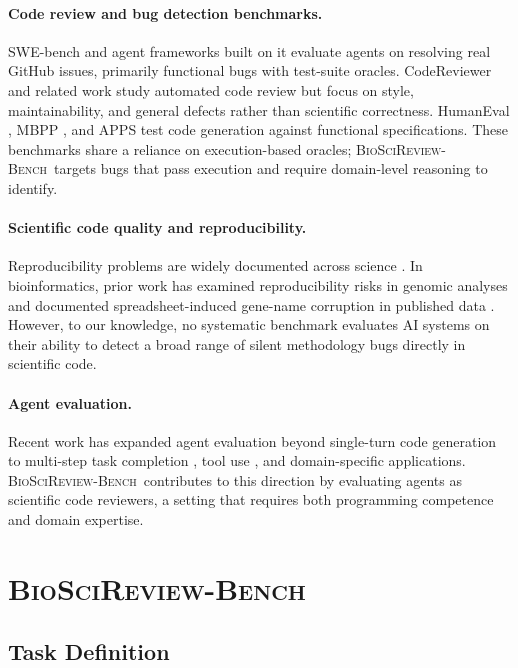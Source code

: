 \documentclass[11pt]{article}
\newcommand{\bench}{\textsc{BioSciReview-Bench}}
\begin{document}
\paragraph{Code review and bug detection benchmarks.}
SWE-bench \citep{jimenez2024swebench} and agent frameworks built on it \citep{yang2024sweagent} evaluate agents on resolving real GitHub issues, primarily functional bugs with test-suite oracles. CodeReviewer \citep{li2022codereviewer} and related work \citep{tufano2024code} study automated code review but focus on style, maintainability, and general defects rather than scientific correctness. HumanEval \citep{chen2021humaneval}, MBPP \citep{austin2021program}, and APPS \citep{hendrycks2021apps} test code generation against functional specifications. These benchmarks share a reliance on execution-based oracles; \bench\ targets bugs that pass execution and require domain-level reasoning to identify.

\paragraph{Scientific code quality and reproducibility.}
Reproducibility problems are widely documented across science \citep{baker2016reproducibility, ioannidis2005false}. In bioinformatics, prior work has examined reproducibility risks in genomic analyses \citep{baykal2024genomic} and documented spreadsheet-induced gene-name corruption in published data \citep{ziemann2016gene}. However, to our knowledge, no systematic benchmark evaluates AI systems on their ability to detect a broad range of silent methodology bugs directly in scientific code.

\paragraph{Agent evaluation.}
Recent work has expanded agent evaluation beyond single-turn code generation to multi-step task completion \citep{liu2024agentbench, xie2024osworld, zhou2024webarena}, tool use \citep{schick2023toolformer, patil2023gorilla}, and domain-specific applications. \bench\ contributes to this direction by evaluating agents as scientific code reviewers, a setting that requires both programming competence and domain expertise.

\section{\bench}

\subsection{Task Definition}
\end{document}
